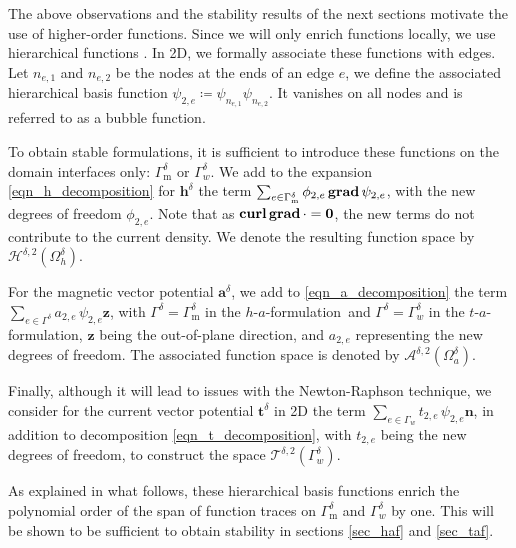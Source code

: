 \documentclass[journal]{IEEEtran}
\renewcommand{\vec}[1]{\boldsymbol{#1}} %
\newcommand{\grad}{\text{\textbf{grad}}\, }
\newcommand{\curl}{\text{\textbf{curl}}\, }
\newcommand{\Def}{\coloneqq}
\newcommand{\n}{\vec n}
\newcommand{\haf}{$h$-$a$-formulation\ }
\newcommand{\tafOnly}{$t$-$a$-formulation}
\newcommand{\Oad}{\Omega_a^\delta}
\newcommand{\Ohd}{\Omega_h^\delta}
\newcommand{\Gd}{\Gamma^\delta}
\newcommand{\Gmd}{\Gamma_\text{m}^\delta}
\newcommand{\Gwd}{\Gamma_w^\delta}
\newcommand{\hspdtwo}{\mathcal{H}^{\delta,2}}
\newcommand{\aspdtwo}{\mathcal{A}^{\delta,2}}
\newcommand{\tspdtwo}{\mathcal{T}^{\delta,2}}
\newcommand{\ad}{\vec a^{\delta}}
\newcommand{\td}{\vec t^{\delta}}
\newcommand{\hd}{\vec h^{\delta}}
\begin{document}
The above observations and the stability results of the next sections motivate the use of higher-order functions. Since we will only enrich functions locally, we use hierarchical functions \cite{zienkiewicz2005finite,geuzaine2001high}. In 2D, we formally associate these functions with edges. Let $n_{e,1}$ and $n_{e,2}$ be the nodes at the ends of an edge $e$, we define the associated hierarchical basis function $\psi_{2,e} \Def \psi_{n_{e,1}} \psi_{n_{e,2}}$. It vanishes on all nodes and is referred to as a bubble function.

To obtain stable formulations, it is sufficient to introduce these functions on the domain interfaces only: $\Gmd$ or $\Gwd$. We add to the expansion \eqref{eqn_h_decomposition} for $\hd$ the term $\sum_{e\in \Gmd} \phi_{2,e}\, \grad \psi_{2,e}$,
with the new degrees of freedom $\phi_{2,e}$. Note that as $\curl \grad \cdot = \vec 0$, the new terms do not contribute to the current density. We denote the resulting function space by $\hspdtwo(\Ohd)$.

For the magnetic vector potential $\ad$, we add to \eqref{eqn_a_decomposition} the term $\sum_{e\in \Gd} a_{2,e}\, \psi_{2,e} \vec z$,
with $\Gd = \Gmd$ in the \haf and $\Gd = \Gwd$ in the \tafOnly, $\vec z$ being the out-of-plane direction, and $a_{2,e}$ representing the new degrees of freedom. The associated function space is denoted by $\aspdtwo(\Oad)$.

Finally, although it will lead to issues with the Newton-Raphson technique, we consider for the current vector potential $\td$ in 2D the term $\sum_{e\in \Gamma_w} t_{2,e}\, \psi_{2,e}\n$,
in addition to decomposition \eqref{eqn_t_decomposition}, with $t_{2,e}$ being the new degrees of freedom, to construct the space $\tspdtwo(\Gwd)$.

As explained in what follows, these hierarchical basis functions enrich the polynomial order of the span of function traces on $\Gmd$ and $\Gwd$ by one. This will be shown to be sufficient to obtain stability in sections \ref{sec_haf} and \ref{sec_taf}.
\end{document}
